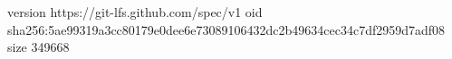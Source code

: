 version https://git-lfs.github.com/spec/v1
oid sha256:5ae99319a3cc80179e0dee6e73089106432dc2b49634cec34c7df2959d7adf08
size 349668

